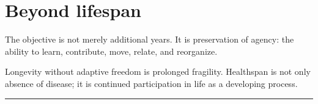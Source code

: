 \section{Beyond lifespan}

The objective is not merely additional years. It is preservation of agency: the ability to learn, contribute, move, relate, and reorganize.

Longevity without adaptive freedom is prolonged fragility. Healthspan is not only absence of disease; it is continued participation in life as a developing process.

\begin{center}\rule{0.5\linewidth}{0.5pt}\end{center}

